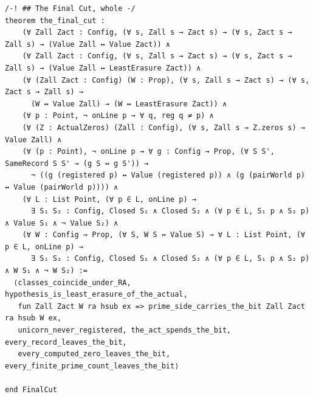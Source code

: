 \documentclass[10pt,twocolumn]{article}
\begin{document}
\begin{Verbatim}
/-! ## The Final Cut, whole -/
theorem the_final_cut :
    (∀ Zall Zact : Config, (∀ s, Zall s → Zact s) → (∀ s, Zact s → Zall s) → (Value Zall ↔ Value Zact)) ∧
    (∀ Zall Zact : Config, (∀ s, Zall s → Zact s) → (∀ s, Zact s → Zall s) → (Value Zall ↔ LeastErasure Zact)) ∧
    (∀ (Zall Zact : Config) (W : Prop), (∀ s, Zall s → Zact s) → (∀ s, Zact s → Zall s) →
      (W ↔ Value Zall) → (W ↔ LeastErasure Zact)) ∧
    (∀ p : Point, ¬ onLine p → ∀ q, reg q ≠ p) ∧
    (∀ (Z : ActualZeros) (Zall : Config), (∀ s, Zall s → Z.zeros s) → Value Zall) ∧
    (∀ (p : Point), ¬ onLine p → ∀ g : Config → Prop, (∀ S S', SameRecord S S' → (g S ↔ g S')) →
      ¬ ((g (registered p) ↔ Value (registered p)) ∧ (g (pairWorld p) ↔ Value (pairWorld p)))) ∧
    (∀ L : List Point, (∀ p ∈ L, onLine p) →
      ∃ S₁ S₂ : Config, Closed S₁ ∧ Closed S₂ ∧ (∀ p ∈ L, S₁ p ∧ S₂ p) ∧ Value S₁ ∧ ¬ Value S₂) ∧
    (∀ W : Config → Prop, (∀ S, W S ↔ Value S) → ∀ L : List Point, (∀ p ∈ L, onLine p) →
      ∃ S₁ S₂ : Config, Closed S₁ ∧ Closed S₂ ∧ (∀ p ∈ L, S₁ p ∧ S₂ p) ∧ W S₁ ∧ ¬ W S₂) :=
  ⟨classes_coincide_under_RA, hypothesis_is_least_erasure_of_the_actual,
   fun Zall Zact W ra hsub ex => prime_side_carries_the_bit Zall Zact ra hsub W ex,
   unicorn_never_registered, the_act_spends_the_bit, every_record_leaves_the_bit,
   every_computed_zero_leaves_the_bit, every_finite_prime_count_leaves_the_bit⟩

end FinalCut


\end{Verbatim}
\end{document}
